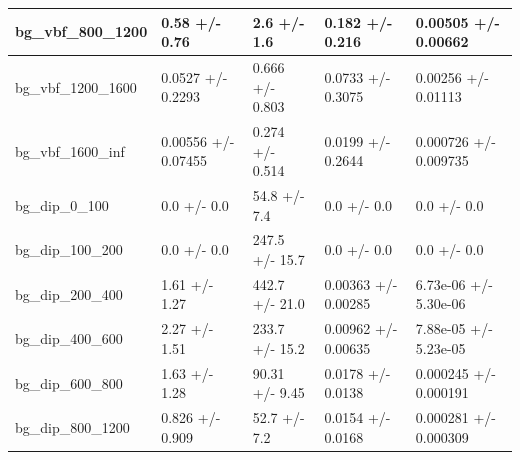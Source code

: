 \documentclass[a4paper, 10pt]{article}
\begin{document}
\begin{table}[H]
\begin{center}
\begin{tabular}{|m{20.0mm}|m{27.0mm}|m{27.0mm}|m{33.0mm}|m{32.0mm}|}
      \hline
      {\cellcolor{white}         bg\_vbf\_800\_1200}& {\cellcolor{white}         0.58 +/\-- 0.76}& {\cellcolor{white}         2.6 +/\-- 1.6}& {\cellcolor{white}         0.182 +/\-- 0.216}& {\cellcolor{white}         0.00505 +/\-- 0.00662}\\
      \hline
      {\cellcolor{white}         bg\_vbf\_1200\_1600}& {\cellcolor{white}         0.0527 +/\-- 0.2293}& {\cellcolor{white}         0.666 +/\-- 0.803}& {\cellcolor{white}         0.0733 +/\-- 0.3075}& {\cellcolor{white}         0.00256 +/\-- 0.01113}\\
      \hline
      {\cellcolor{white}         bg\_vbf\_1600\_inf}& {\cellcolor{white}         0.00556 +/\-- 0.07455}& {\cellcolor{white}         0.274 +/\-- 0.514}& {\cellcolor{white}         0.0199 +/\-- 0.2644}& {\cellcolor{white}         0.000726 +/\-- 0.009735}\\
      \hline
      {\cellcolor{white}         bg\_dip\_0\_100}& {\cellcolor{white}         0.0 +/\-- 0.0}& {\cellcolor{white}         54.8 +/\-- 7.4}& {\cellcolor{white}         0.0 +/\-- 0.0}& {\cellcolor{white}         0.0 +/\-- 0.0}\\
      \hline
      {\cellcolor{white}         bg\_dip\_100\_200}& {\cellcolor{white}         0.0 +/\-- 0.0}& {\cellcolor{white}         247.5 +/\-- 15.7}& {\cellcolor{white}         0.0 +/\-- 0.0}& {\cellcolor{white}         0.0 +/\-- 0.0}\\
      \hline
      {\cellcolor{white}         bg\_dip\_200\_400}& {\cellcolor{white}         1.61 +/\-- 1.27}& {\cellcolor{white}         442.7 +/\-- 21.0}& {\cellcolor{white}         0.00363 +/\-- 0.00285}& {\cellcolor{white}         6.73e-06 +/\-- 5.30e-06}\\
      \hline
      {\cellcolor{white}         bg\_dip\_400\_600}& {\cellcolor{white}         2.27 +/\-- 1.51}& {\cellcolor{white}         233.7 +/\-- 15.2}& {\cellcolor{white}         0.00962 +/\-- 0.00635}& {\cellcolor{white}         7.88e-05 +/\-- 5.23e-05}\\
      \hline
      {\cellcolor{white}         bg\_dip\_600\_800}& {\cellcolor{white}         1.63 +/\-- 1.28}& {\cellcolor{white}         90.31 +/\-- 9.45}& {\cellcolor{white}         0.0178 +/\-- 0.0138}& {\cellcolor{white}         0.000245 +/\-- 0.000191}\\
      \hline
      {\cellcolor{white}         bg\_dip\_800\_1200}& {\cellcolor{white}         0.826 +/\-- 0.909}& {\cellcolor{white}         52.7 +/\-- 7.2}& {\cellcolor{white}         0.0154 +/\-- 0.0168}& {\cellcolor{white}         0.000281 +/\-- 0.000309}\\

\end{tabular}
\end{center}
\end{table}
\end{document}
